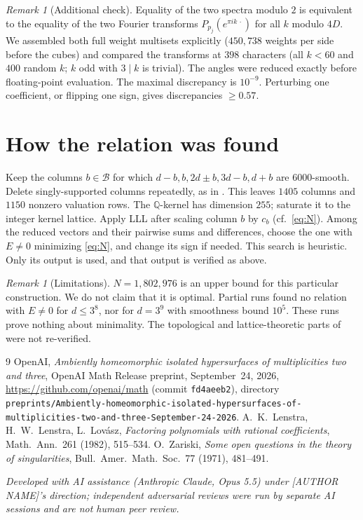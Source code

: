 \documentclass[11pt]{amsart}
\theoremstyle{remark}
\newtheorem{remark}[theorem]{Remark}
\newcommand{\B}{\mathcal{B}}
\begin{document}
\begin{remark}[Additional check]
Equality of the two spectra modulo $2$ is equivalent to the equality of the two Fourier transforms
$P_{p_j}(e^{\pi i k\,\cdot})$ for all $k$ modulo $4D$. We assembled both full weight multisets explicitly
($450{,}738$ weights per side before the cubes) and compared the transforms at $398$ characters
(all $k<60$ and $400$ random $k$; $k$ odd with $3\mid k$ is trivial). The angles were reduced exactly
before floating-point evaluation. The maximal discrepancy is $10^{-9}$. Perturbing one coefficient, or
flipping one sign, gives discrepancies $\ge0.57$.
\end{remark}

\section{How the relation was found}
Keep the columns $b\in\B$ for which $d-b,b,2d\pm b,3d-b,d+b$ are $6000$-smooth. Delete singly-supported
columns repeatedly, as in \cite[proof of Lemma~\texttt{seed:product}]{OAI059}. This leaves $1405$ columns
and $1150$ nonzero valuation rows. The $\mathbb Q$-kernel has dimension $255$; saturate it to the integer
kernel lattice. Apply LLL after scaling column $b$ by $c_b$ (cf.\ \eqref{eq:N}). Among the reduced vectors
and their pairwise sums and differences, choose the one with $E\neq0$ minimizing \eqref{eq:N}, and change
its sign if needed. This search is heuristic. Only its output is used, and that output is verified as above.

\begin{remark}[Limitations]
$N=1{,}802{,}976$ is an upper bound for this particular construction. We do not claim that it is
optimal. Partial runs found no relation with $E\ne0$ for $d\le3^8$, nor for $d=3^9$ with smoothness
bound $10^5$. These runs prove nothing about minimality. The topological and lattice-theoretic parts of
\cite{OAI059} were not re-verified.
\end{remark}

\begin{thebibliography}{9}
 OpenAI, \emph{Ambiently homeomorphic isolated hypersurfaces of multiplicities two and three},
 OpenAI Math Release preprint, September~24, 2026,
 \url{https://github.com/openai/math} (commit \texttt{fd4aeeb2}), directory
 \texttt{preprints/Ambiently-homeomorphic-isolated-hypersurfaces-of-multiplicities-two-and-three-September-24-2026}.
 A.~K.~Lenstra, H.~W.~Lenstra, L.~Lov\'asz, \emph{Factoring polynomials with rational
 coefficients}, Math.\ Ann.\ 261 (1982), 515--534.
 O.~Zariski, \emph{Some open questions in the theory of singularities},
 Bull.\ Amer.\ Math.\ Soc.\ 77 (1971), 481--491.
\end{thebibliography}

\noindent\emph{Developed with AI assistance (Anthropic Claude, Opus 5.5) under [AUTHOR NAME]'s direction;
independent adversarial reviews were run by separate AI sessions and are not human peer review.}
\end{document}
